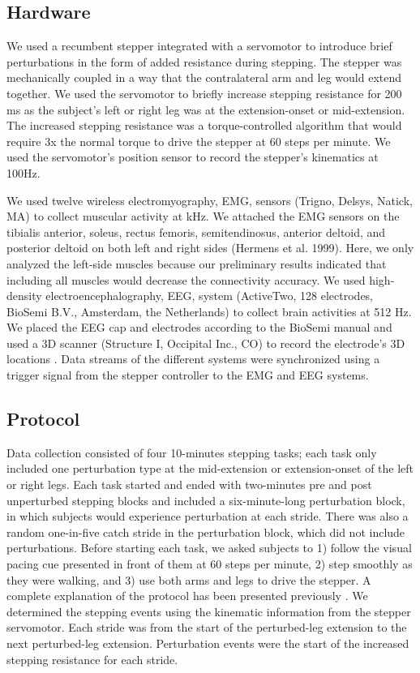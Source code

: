 \documentclass[../thesis_seyed.tex]{subfiles}
\begin{document}
\subsection{Hardware}
We used a recumbent stepper integrated with a servomotor \cite{Huang2009-of} to introduce brief perturbations in the form of added resistance during stepping. The stepper was mechanically coupled in a way that the contralateral arm and leg would extend together. We used the servomotor to briefly increase stepping resistance for 200 ms as the subject's left or right leg was at the extension-onset or mid-extension. The increased stepping resistance was a torque-controlled algorithm that would require 3x the normal torque to drive the stepper at 60 steps per minute. We used the servomotor's position sensor to record the stepper's kinematics at 100Hz.

We used twelve wireless electromyography, EMG, sensors (Trigno, Delsys, Natick, MA) to collect muscular activity at  kHz. We attached the EMG sensors on the tibialis anterior, soleus, rectus femoris, semitendinosus, anterior deltoid, and posterior deltoid on both left and right sides (Hermens et al. 1999). Here, we only analyzed the left-side muscles because our preliminary results indicated that including all muscles would decrease the connectivity accuracy. We used high-density electroencephalography, EEG, system (ActiveTwo, 128 electrodes, BioSemi B.V., Amsterdam, the Netherlands) to collect brain activities at 512 Hz. We placed the EEG cap and electrodes according to the BioSemi manual and used a 3D scanner (Structure I, Occipital Inc., CO) to record the electrode's 3D locations \cite{Shirazi2019-im}. Data streams of the different systems were synchronized using a trigger signal from the stepper controller to the EMG and EEG systems.

\subsection{Protocol}
Data collection consisted of four 10-minutes stepping tasks; each task only included one perturbation type at the mid-extension or extension-onset of the left or right legs. Each task started and ended with two-minutes pre and post unperturbed stepping blocks and included a six-minute-long perturbation block, in which subjects would experience perturbation at each stride. There was also a random one-in-five catch stride in the perturbation block, which did not include perturbations. Before starting each task, we asked subjects to 1) follow the visual pacing cue presented in front of them at 60 steps per minute, 2) step smoothly as they were walking, and 3) use both arms and legs to drive the stepper. A complete explanation of the protocol has been presented previously \cite{Shirazi2021-ha}. We determined the stepping events using the kinematic information from the stepper servomotor. Each stride was from the start of the perturbed-leg extension to the next perturbed-leg extension. Perturbation events were the start of the increased stepping resistance for each stride.
\end{document}
